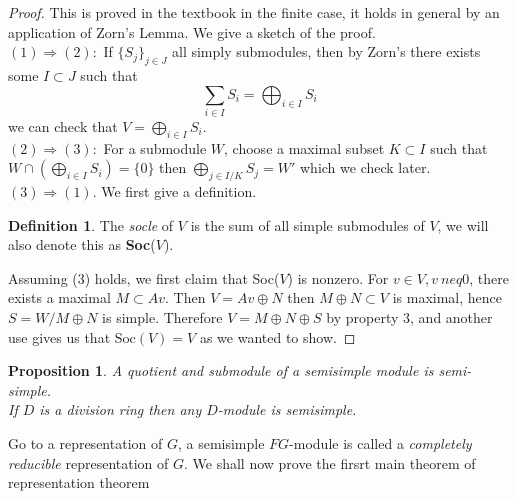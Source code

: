 \documentclass{article}
\theoremstyle{definition}
\newtheorem{definition}[theorem]{Definition}
\theoremstyle{remark}
\theoremstyle{plain}
\newtheorem{proposition}[theorem]{Proposition}
\newcommand{\ic}{\cap}
\begin{document}
 \begin{proof}
 This is proved in the textbook in the finite case, it holds in general by an application of Zorn's Lemma.
 We give a sketch of the proof.\\

 $(1) \Longrightarrow (2):$ If $\{S_j\}_{j \in J}$ all simply submodules, then by Zorn's there exists some $I \subset J$ such that 
 \[ \sum_{i \in I} S_i = \bigoplus_{i \in I} S_i\]
 we can check that $V = \bigoplus_{i \in I} S_i$.\\

 $(2) \Longrightarrow (3):$ For a submodule $W$, choose a maximal subset $K \subset I$ such that $W \ic (\bigoplus_{i \in I} S_i) = \{0\}$ then $\bigoplus_{j \in I/K} S_j = W'$ which we check later.\\

 $(3) \Longrightarrow (1)$. We first give a definition.
\begin{definition}
	The \textit{socle} of $V$ is the sum of all simple submodules of $V$, we will also denote this as \textbf{Soc}($V$).
\end{definition}
Assuming (3) holds, we first claim that Soc($V$) is nonzero.
For $v \in V, v\ neq 0$, there exists a maximal $M \subset Av$.
Then $V = Av \oplus N$ then $M \oplus N \subset V$ is maximal, hence $S = W/M \oplus N$ is simple.
Therefore $V = M \oplus N \oplus S$ by property 3, and another use gives us that $\text{Soc}(V) = V$ as we wanted to show.

\end{proof}

\begin{proposition}
	A quotient and submodule of a semisimple module is semi-simple.\\
	If $D$ is a division ring then any $D$-module is semisimple.
\end{proposition}

Go to a representation of $G$, a semisimple $FG$-module is called a \textit{completely reducible} representation of $G$.
We shall now prove the firsrt main theorem of representation theorem
\end{document}

